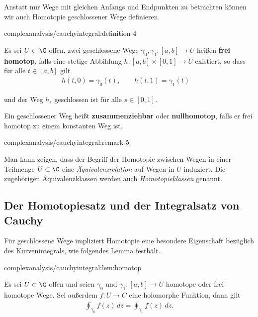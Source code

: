\documentclass[letterpaper,10pt,german]{jupyterBook}
\begin{document}
\par
Anstatt nur Wege mit gleichen Anfangs und Endpunkten zu betrachten können wir auch Homotopie geschlossener Wege definieren.
\begin{definition}{}{complexanalysis/cauchyintegral:definition-4}



\par
Es sei \(U\subset\C\) offen, zwei geschlossene Wege \(\gamma_0, \gamma_1:[a,b]\to U\) heißen \textbf{frei homotop}, falls eine stetige Abbildung \(h:[a,b]\times[0,1]\to U\) existiert, so dass für alle \(t\in[a,b]\) gilt
\begin{align*}
h(t,0) = \gamma_0(t), \qquad h(t,1) = \gamma_1(t)\quad
\end{align*}
\par
und der Weg \(h_s\) geschlossen ist für alle \(s\in [0,1]\).

\par
Ein geschlossener Weg heißt \textbf{zusammenziehbar} oder \textbf{nullhomotop}, falls er frei homotop zu einem konstanten Weg ist.
\end{definition}
\begin{remark}{}{complexanalysis/cauchyintegral:remark-5}



\par
Man kann zeigen, dass der Begriff der Homotopie zwischen Wegen in einer Teilmenge \(U \subset \C\) eine \emph{Äquivalenzrelation} auf Wegen in \(U\) induziert. Die zugehörigen Äquivalenzklassen werden auch \emph{Homotopieklassen} genannt.
\end{remark}


\subsection{Der Homotopiesatz und der Integralsatz von Cauchy}
\label{\detokenize{complexanalysis/cauchyintegral:der-homotopiesatz-und-der-integralsatz-von-cauchy}}
\par
Für geschlossene Wege impliziert Homotopie eine besondere Eigenschaft bezüglich des Kurvenintegrals, wie folgendes Lemma festhält.
\begin{lemma}{}{complexanalysis/cauchyintegral:lem:homotop}



\par
Es sei \(U \subset \C\) offen und seien \(\gamma_0\) und \(\gamma_1:[a,b]\to U\) homotope oder frei homotope Wege.
Sei außerdem \(f:U\to C\) eine holomorphe Funktion, dann gilt
\begin{align*}
\oint_{\gamma_0} f(z) \, dz = \oint_{\gamma_1} f(z) \, dz.
\end{align*}\end{lemma}
\end{document}
